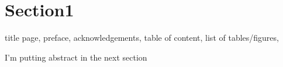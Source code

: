 \section{Section1}
title page, preface, acknowledgements, table of content, list of tables/figures, 

I'm putting abstract in the next section
